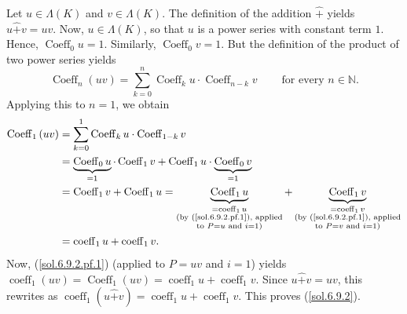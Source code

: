 \documentclass[numbers=enddot,12pt,final,onecolumn,notitlepage]{scrartcl}%
\begin{document}
Let $u\in\Lambda\left(  K\right)  $ and $v\in\Lambda\left(  K\right)  $. The
definition of the addition $\widehat{+}$ yields $u\widehat{+}v=uv$. Now,
$u\in\Lambda\left(  K\right)  $, so that $u$ is a power series with constant
term $1$. Hence, $\operatorname*{Coeff}\nolimits_{0}u=1$. Similarly,
$\operatorname*{Coeff}\nolimits_{0}v=1$. But the definition of the product of
two power series yields%
\[
\operatorname*{Coeff}\nolimits_{n}\left(  uv\right)  =\sum_{k=0}%
^{n}\operatorname*{Coeff}\nolimits_{k}u\cdot\operatorname*{Coeff}%
\nolimits_{n-k}v\ \ \ \ \ \ \ \ \ \ \text{for every }n\in\mathbb{N}\text{.}%
\]
Applying this to $n=1$, we obtain%
\begin{align*}
\operatorname*{Coeff}\nolimits_{1}\left(  uv\right)   &  =\sum_{k=0}%
^{1}\operatorname*{Coeff}\nolimits_{k}u\cdot\operatorname*{Coeff}%
\nolimits_{1-k}v\\
&  =\underbrace{\operatorname*{Coeff}\nolimits_{0}u}_{=1}\cdot
\operatorname*{Coeff}\nolimits_{1}v+\operatorname*{Coeff}\nolimits_{1}%
u\cdot\underbrace{\operatorname*{Coeff}\nolimits_{0}v}_{=1}\\
&  =\operatorname*{Coeff}\nolimits_{1}v+\operatorname*{Coeff}\nolimits_{1}%
u=\underbrace{\operatorname*{Coeff}\nolimits_{1}u}%
_{\substack{=\operatorname*{coeff}\nolimits_{1}u\\\text{(by
(\ref{sol.6.9.2.pf.1}), applied}\\\text{to }P=u\text{ and }i=1\text{)}%
}}+\underbrace{\operatorname*{Coeff}\nolimits_{1}v}%
_{\substack{=\operatorname*{coeff}\nolimits_{1}v\\\text{(by
(\ref{sol.6.9.2.pf.1}), applied}\\\text{to }P=v\text{ and }i=1\text{)}}}\\
&  =\operatorname*{coeff}\nolimits_{1}u+\operatorname*{coeff}\nolimits_{1}v.
\end{align*}
Now, (\ref{sol.6.9.2.pf.1}) (applied to $P=uv$ and $i=1$) yields
$\operatorname*{coeff}\nolimits_{1}\left(  uv\right)  =\operatorname*{Coeff}%
\nolimits_{1}\left(  uv\right)  =\operatorname*{coeff}\nolimits_{1}%
u+\operatorname*{coeff}\nolimits_{1}v$. Since $u\widehat{+}v=uv$, this
rewrites as $\operatorname*{coeff}\nolimits_{1}\left(  u\widehat{+}v\right)
=\operatorname*{coeff}\nolimits_{1}u+\operatorname*{coeff}\nolimits_{1}v$.
This proves (\ref{sol.6.9.2}).
\end{document}
